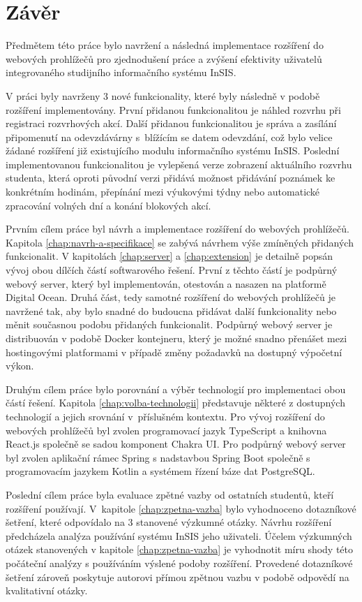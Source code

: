 \chapter*{Závěr}

Předmětem této práce bylo navržení a následná implementace rozšíření do webových prohlížečů pro zjednodušení práce a zvýšení efektivity uživatelů integrovaného studijního informačního systému InSIS.

V práci byly navrženy 3 nové funkcionality, které byly následně v podobě rozšíření implementovány. První přidanou funkcionalitou je náhled rozvrhu při registraci rozvrhových akcí. Další přidanou funkcionalitou je správa a zasílání připomenutí na odevzdávárny s~blížícím se datem odevzdání, což bylo velice žádané rozšíření již existujícího modulu informačního systému InSIS. Poslední implementovanou funkcionalitou je vylepšená verze zobrazení aktuálního rozvrhu studenta, která oproti původní verzi přidává možnost přidávání poznámek ke konkrétním hodinám, přepínání mezi výukovými týdny nebo automatické zpracování volných dní a konání blokových akcí.

Prvním cílem práce byl návrh a implementace rozšíření do webových prohlížečů. Kapitola \ref{chap:navrh-a-specifikace} se zabývá návrhem výše zmíněných přidaných funkcionalit. V kapitolách \ref{chap:server} a \ref{chap:extension} je detailně popsán vývoj obou dílčích částí softwarového řešení. První z těchto částí je podpůrný webový server, který byl implementován, otestován a nasazen na platformě Digital Ocean. Druhá část, tedy samotné rozšíření do webových prohlížečů je navržené tak, aby bylo snadné do budoucna přidávat další funkcionality nebo měnit současnou podobu přidaných funkcionalit. Podpůrný webový server je distribuován v podobě Docker kontejneru, který je možné snadno přenášet mezi hostingovými platformami v případě změny požadavků na dostupný výpočetní výkon. 

Druhým cílem práce bylo porovnání a výběr technologií pro implementaci obou částí řešení. Kapitola \ref{chap:volba-technologii} představuje některé z dostupných technologií a jejich srovnání v~příslušném kontextu. Pro vývoj rozšíření do webových prohlížečů byl zvolen programovací jazyk TypeScript a knihovna React.js společně se sadou komponent Chakra UI. Pro podpůrný webový server byl zvolen aplikační rámec Spring s nadstavbou Spring Boot společně s programovacím jazykem Kotlin a systémem řízení báze dat PostgreSQL. 

Poslední cílem práce byla evaluace zpětné vazby od ostatních studentů, kteří rozšíření používají. V~kapitole \ref{chap:zpetna-vazba} bylo vyhodnoceno dotazníkové šetření, které odpovídalo na 3 stanovené výzkumné otázky. Návrhu rozšíření předcházela analýza používání systému InSIS jeho uživateli. Účelem výzkumných otázek stanovených v kapitole \ref{chap:zpetna-vazba} je vyhodnotit míru shody této počáteční analýzy s používáním výslené podoby rozšíření. Provedené dotazníkové šetření zároveň poskytuje autorovi přímou zpětnou vazbu v podobě odpovědí na kvalitativní otázky.

